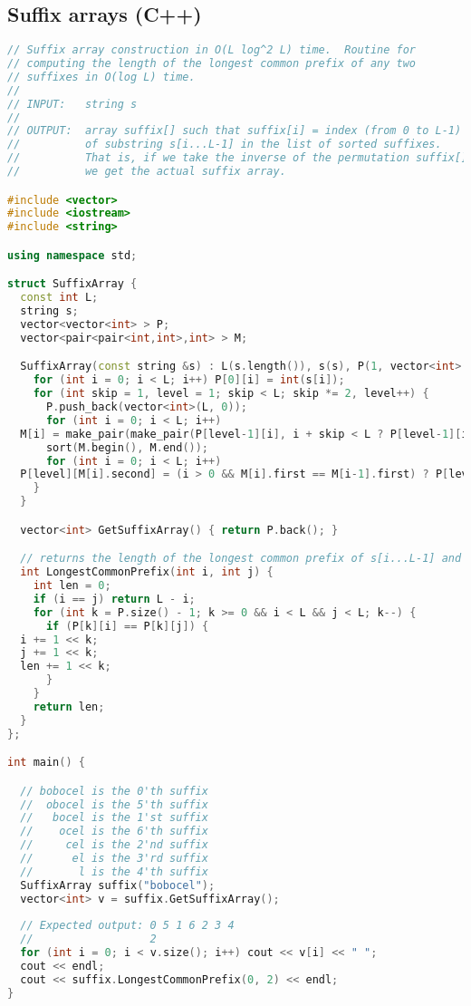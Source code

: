 \subsection{Suffix arrays (C++)}
\begin{lstlisting}[language=C++]
// Suffix array construction in O(L log^2 L) time.  Routine for
// computing the length of the longest common prefix of any two
// suffixes in O(log L) time.
//
// INPUT:   string s
//
// OUTPUT:  array suffix[] such that suffix[i] = index (from 0 to L-1)
//          of substring s[i...L-1] in the list of sorted suffixes.
//          That is, if we take the inverse of the permutation suffix[],
//          we get the actual suffix array.

#include <vector>
#include <iostream>
#include <string>

using namespace std;

struct SuffixArray {
  const int L;
  string s;
  vector<vector<int> > P;
  vector<pair<pair<int,int>,int> > M;

  SuffixArray(const string &s) : L(s.length()), s(s), P(1, vector<int>(L, 0)), M(L) {
    for (int i = 0; i < L; i++) P[0][i] = int(s[i]);
    for (int skip = 1, level = 1; skip < L; skip *= 2, level++) {
      P.push_back(vector<int>(L, 0));
      for (int i = 0; i < L; i++) 
  M[i] = make_pair(make_pair(P[level-1][i], i + skip < L ? P[level-1][i + skip] : -1000), i);
      sort(M.begin(), M.end());
      for (int i = 0; i < L; i++) 
  P[level][M[i].second] = (i > 0 && M[i].first == M[i-1].first) ? P[level][M[i-1].second] : i;
    }    
  }

  vector<int> GetSuffixArray() { return P.back(); }

  // returns the length of the longest common prefix of s[i...L-1] and s[j...L-1]
  int LongestCommonPrefix(int i, int j) {
    int len = 0;
    if (i == j) return L - i;
    for (int k = P.size() - 1; k >= 0 && i < L && j < L; k--) {
      if (P[k][i] == P[k][j]) {
  i += 1 << k;
  j += 1 << k;
  len += 1 << k;
      }
    }
    return len;
  }
};

int main() {

  // bobocel is the 0'th suffix
  //  obocel is the 5'th suffix
  //   bocel is the 1'st suffix
  //    ocel is the 6'th suffix
  //     cel is the 2'nd suffix
  //      el is the 3'rd suffix
  //       l is the 4'th suffix
  SuffixArray suffix("bobocel");
  vector<int> v = suffix.GetSuffixArray();
  
  // Expected output: 0 5 1 6 2 3 4
  //                  2
  for (int i = 0; i < v.size(); i++) cout << v[i] << " ";
  cout << endl;
  cout << suffix.LongestCommonPrefix(0, 2) << endl;
}

\end{lstlisting}
